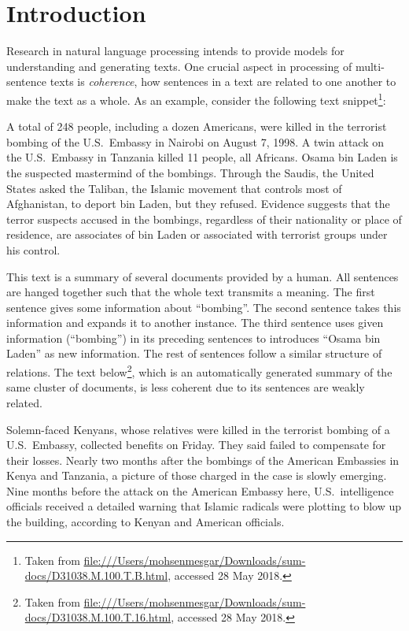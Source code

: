 
\chapter{Introduction}
\label{ch:intro}

Research in natural language processing intends to provide models for understanding and generating texts.   
One crucial aspect in processing of multi-sentence texts is \emph{coherence}, how sentences in a text are related to one another to make the text as a whole. 
As an example, consider the following text snippet\footnote{Taken from \url{file:///Users/mohsenmesgar/Downloads/sum-docs/D31038.M.100.T.B.html}, accessed 28 May 2018.}:

\begin{examples}
A total of 248 people, including a dozen Americans, were killed in the terrorist bombing of the U.S.\ Embassy in Nairobi on August 7, 1998. 
A twin attack on the U.S.\ Embassy in Tanzania killed 11 people, all Africans. 
Osama bin Laden is the suspected mastermind of the bombings. 
Through the Saudis, the United States asked the Taliban, the Islamic movement that controls most of Afghanistan, to deport bin Laden, but they refused. 
Evidence suggests that the terror suspects accused in the bombings, regardless of their nationality or place of residence, are associates of bin Laden or associated with terrorist groups under his control.
\end{examples}

This text is a summary of several documents provided by a human. 
All sentences are hanged together such that the whole text transmits a meaning. 
The first sentence gives some information about ``bombing''. 
The second sentence takes this information and expands it to another instance. 
The third sentence uses given information (``bombing'') in its preceding sentences to introduces ``Osama bin Laden'' as new information. 
The rest of sentences follow a similar structure of relations.  
The text below\footnote{Taken from \url{file:///Users/mohsenmesgar/Downloads/sum-docs/D31038.M.100.T.16.html}, accessed 28 May 2018.}, which is an automatically generated summary of the same cluster of documents, is less coherent due to its sentences are weakly related. 

\begin{examples}
Solemn-faced Kenyans, whose relatives were killed in the terrorist bombing of a U.S.\ Embassy, collected benefits on Friday. 
They said failed to compensate for their losses. 
Nearly two months after the bombings of the American Embassies in Kenya and Tanzania, a picture of those charged in the case is slowly emerging. 
Nine months before the attack on the American Embassy here, U.S.\ intelligence officials received a detailed warning that Islamic radicals were plotting to blow up the building, according to Kenyan and American officials. 
\end{examples}

